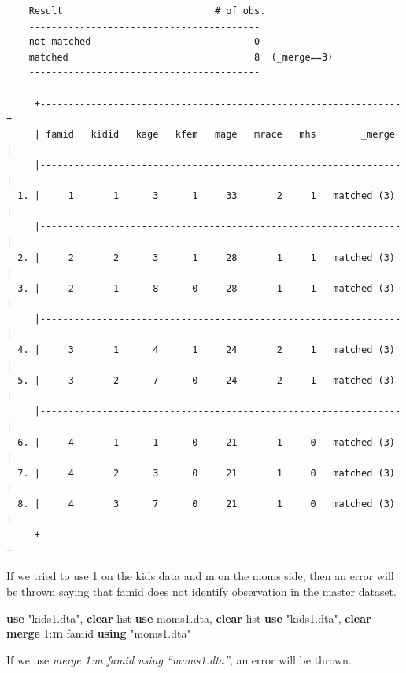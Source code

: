 \documentclass[
]{book}
\newenvironment{Shaded}{\begin{snugshade}}{\end{snugshade}}
\newcommand{\FunctionTok}[1]{\textcolor[rgb]{0.13,0.29,0.53}{\textbf{#1}}}
\newcommand{\KeywordTok}[1]{\textcolor[rgb]{0.13,0.29,0.53}{\textbf{#1}}}
\newcommand{\NormalTok}[1]{#1}
\newcommand{\OtherTok}[1]{\textcolor[rgb]{0.56,0.35,0.01}{#1}}
\newcommand{\StringTok}[1]{\textcolor[rgb]{0.31,0.60,0.02}{#1}}
\begin{document}
\begin{verbatim}
    Result                           # of obs.
    -----------------------------------------
    not matched                             0
    matched                                 8  (_merge==3)
    -----------------------------------------

     +----------------------------------------------------------------+
     | famid   kidid   kage   kfem   mage   mrace   mhs        _merge |
     |----------------------------------------------------------------|
  1. |     1       1      3      1     33       2     1   matched (3) |
     |----------------------------------------------------------------|
  2. |     2       2      3      1     28       1     1   matched (3) |
  3. |     2       1      8      0     28       1     1   matched (3) |
     |----------------------------------------------------------------|
  4. |     3       1      4      1     24       2     1   matched (3) |
  5. |     3       2      7      0     24       2     1   matched (3) |
     |----------------------------------------------------------------|
  6. |     4       1      1      0     21       1     0   matched (3) |
  7. |     4       2      3      0     21       1     0   matched (3) |
  8. |     4       3      7      0     21       1     0   matched (3) |
     +----------------------------------------------------------------+
\end{verbatim}

If we tried to use 1 on the kids data and m on the moms side, then an error will be thrown saying that famid does not identify observation in the master dataset.

\begin{Shaded}
\begin{Highlighting}[]
\KeywordTok{use} \StringTok{"kids1.dta"}\NormalTok{, }\KeywordTok{clear}
\OtherTok{list}
\KeywordTok{use}\NormalTok{ moms1.dta, }\KeywordTok{clear}
\OtherTok{list}
\KeywordTok{use} \StringTok{"kids1.dta"}\NormalTok{, }\KeywordTok{clear}
\KeywordTok{merge}\NormalTok{ 1:}\FunctionTok{m}\NormalTok{ famid }\KeywordTok{using} \StringTok{"moms1.dta"}
\end{Highlighting}
\end{Shaded}

If we use \emph{merge 1:m famid using ``moms1.dta''}, an error will be thrown.
\end{document}
